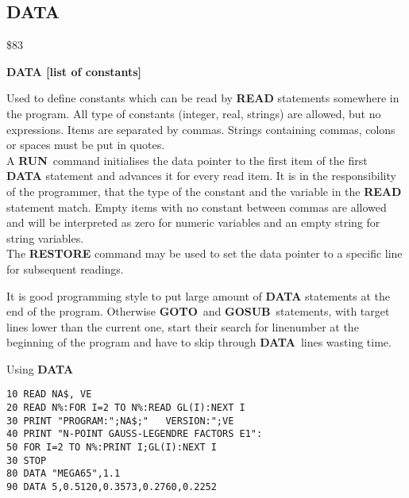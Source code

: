 
\newpage
\subsection{DATA}
\begin{description}[leftmargin=2cm,style=nextline]
\item [Token:] \$83
\item [Format:] {\bf DATA [list of constants]}
\item [Usage:] Used to define constants
               which can be read by {\bf READ} statements somewhere
               in the program. All type of constants (integer, real,
               strings) are allowed, but no expressions.
               Items are separated by commas.
               Strings containing commas, colons or spaces must be put
               in quotes. \\
               A {\bf RUN} command initialises the data pointer
               to the first item of the first {\bf DATA} statement
               and advances it for every read item. It is in the
               responsibility of the programmer, that the type of
               the constant and the variable in the {\bf READ}
               statement match. Empty items with no constant
               between commas are allowed and will be interpreted as
               zero for numeric variables and an empty string for
               string variables. \\
               The {\bf RESTORE} command may be used to set the
               data pointer to a specific line for subsequent
               readings.

\item [Remarks:] It is good programming style to put large amount of
               {\bf DATA} statements at the end of the program.
               Otherwise {\bf GOTO} and {\bf GOSUB} statements, with
               target lines lower than the current one,
               start their search for linenumber at the beginning of
               the program and have to skip through {\bf DATA} lines
               wasting time.
\item [Example:] Using {\bf DATA}
\begin{tcolorbox}[colback=black,coltext=white]
\verbatimfont{\codefont}
\begin{verbatim}
10 READ NA$, VE
20 READ N%
30 PRINT "PROGRAM:";NA$;"   VERSION:";VE
40 PRINT "N-POINT GAUSS-LEGENDRE FACTORS E1":
50 FOR I=2 TO N%
30 STOP
80 DATA "MEGA65",1.1
90 DATA 5,0.5120,0.3573,0.2760,0.2252
\end{verbatim}
\end{tcolorbox}
\end{description}

